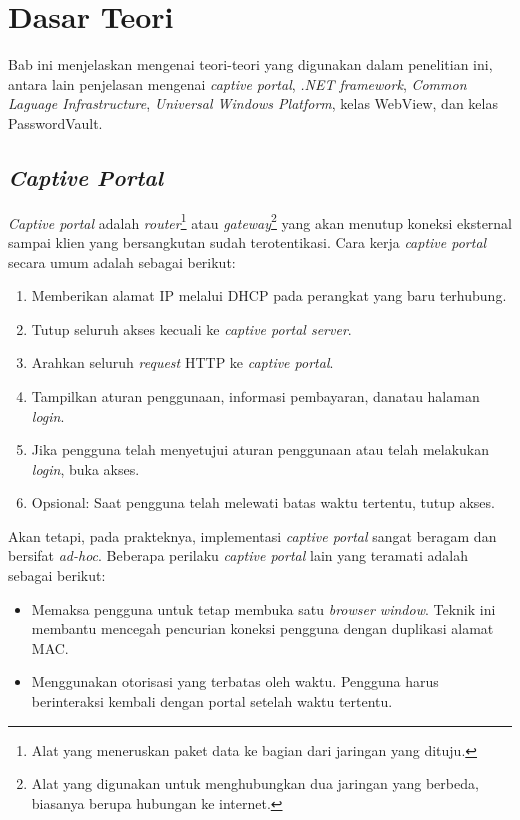 \chapter{Dasar Teori}
\label{chap:dasar_teori}

Bab ini menjelaskan mengenai teori-teori yang digunakan dalam penelitian ini, antara lain penjelasan mengenai \textit{captive portal}, \textit{.NET framework}, \textit{Common Laguage Infrastructure}, \textit{Universal Windows Platform}, kelas WebView, dan kelas PasswordVault.



\section{\textit{Captive Portal}}
\label{sec:captive_portal}

\textit{Captive portal} adalah \textit{router}\footnote{Alat yang meneruskan paket data ke bagian dari jaringan yang dituju.} atau \textit{gateway}\footnote{Alat yang digunakan untuk menghubungkan dua jaringan yang berbeda, biasanya berupa hubungan ke internet.} yang akan menutup koneksi eksternal sampai klien yang bersangkutan sudah terotentikasi\cite{Potter:2002}. Cara kerja \textit{captive portal} secara umum adalah sebagai berikut:

\begin{enumerate}
    \item{Memberikan alamat IP melalui DHCP pada perangkat yang baru terhubung.}
    \item{Tutup seluruh akses kecuali ke \textit{captive portal server}.}
    \item{Arahkan seluruh \textit{request} HTTP ke \textit{captive portal}.}
    \item{Tampilkan aturan penggunaan, informasi pembayaran, dan\/atau halaman \textit{login}.}
    \item{Jika pengguna telah menyetujui aturan penggunaan atau telah melakukan \textit{login}, buka akses.}
    \item{Opsional: Saat pengguna telah melewati batas waktu tertentu, tutup akses.}
\end{enumerate}

Akan tetapi, pada prakteknya, implementasi \textit{captive portal} sangat beragam dan bersifat \textit{ad-hoc}\cite{HTTPWG_CP:2016}. Beberapa perilaku \textit{captive portal} lain yang teramati adalah sebagai berikut:

\begin{itemize}
    \item{Memaksa pengguna untuk tetap membuka satu \textit{browser window}. Teknik ini membantu mencegah pencurian koneksi pengguna dengan duplikasi alamat MAC.}
    \item{Menggunakan otorisasi yang terbatas oleh waktu. Pengguna harus berinteraksi kembali dengan portal setelah waktu tertentu.}
\end{itemize}

